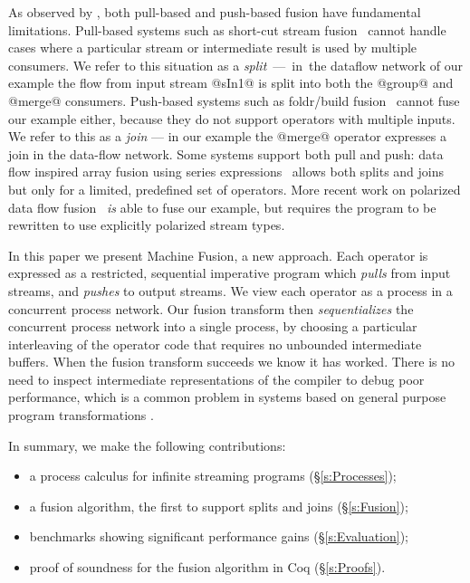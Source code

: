 As observed by \citet{kay2009you}, both pull-based and push-based fusion have fundamental limitations. Pull-based systems such as short-cut stream fusion~\cite{coutts2007stream} cannot handle cases where a particular stream or intermediate result is used by multiple consumers. We refer to this situation as a \mbox{\emph{split} --- in the} dataflow network of our example the flow from input stream @sIn1@ is split into both the @group@ and @merge@ consumers. Push-based systems such as foldr/build fusion~\cite{gill1993short} cannot fuse our example either, because they do not support operators with multiple inputs. We refer to this as a \emph{join} --- in our example the @merge@ operator expresses a join in the data-flow network. Some systems support both pull and push: data flow inspired array fusion using series expressions~\cite{lippmeier2013data} allows both splits and joins but only for a limited, predefined set of operators. More recent work on polarized data flow fusion~\cite{lippmeier2016polarized} \emph{is} able to fuse our example, but requires the program to be rewritten to use explicitly polarized stream types. 

In this paper we present Machine Fusion, a new approach. Each operator is expressed as a restricted, sequential imperative program which \emph{pulls} from input streams, and \emph{pushes} to output streams. We view each operator as a process in a concurrent process network. Our fusion transform then \emph{sequentializes} the concurrent process network into a single process, by choosing a particular interleaving of the operator code that requires no unbounded intermediate buffers. When the fusion transform succeeds we know it has worked. There is no need to inspect intermediate representations of the compiler to debug poor performance, which is a common problem in systems based on general purpose program transformations \cite{lippmeier2012:guiding}.

In summary, we make the following contributions:
\begin{itemize}
\item a process calculus for infinite streaming programs (\S\ref{s:Processes});
\item a fusion algorithm, the first to support splits and joins (\S\ref{s:Fusion});
\item benchmarks showing significant performance gains (\S\ref{s:Evaluation});
\item proof of soundness for the fusion algorithm in Coq (\S\ref{s:Proofs}).
\end{itemize}

